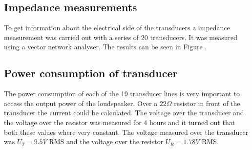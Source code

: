 \subsection{Impedance measurements}
To get information about the electrical side of the transducers a impedance measurement was carried out with a series of 20 transducers. It was measured using a vector network analyser. The results can be seen in Figure .
\subsection{Power consumption of transducer}\label{6_subsec:Power_cons}
The power consumption of each of the 19 transducer lines is very important to access the output power of the loudspeaker. Over a $22 \Omega$ resistor in front of the transducer the current could be calculated. The voltage over the transducer and the voltage over the resistor was measured for 4 hours and it turned out that both these values where very constant. The voltage measured over the transducer was $U_T = 9.5 V$ RMS and the voltage over the resistor $U_R = 1.78 V$ RMS.
\newpage